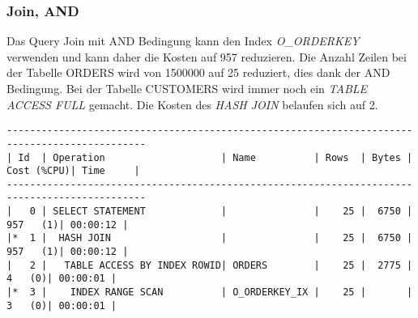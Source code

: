 \documentclass[11pt,a4paper,parskip=half]{scrartcl}
\begin{document}
\subsubsection{Join, AND}
Das Query Join mit AND Bedingung kann den Index \emph{O\_ORDERKEY} verwenden und kann daher die Kosten auf 957 reduzieren. Die Anzahl Zeilen bei der Tabelle ORDERS wird von 1500000 auf 25 reduziert, dies dank der AND Bedingung. Bei der Tabelle CUSTOMERS wird immer noch ein \emph{TABLE ACCESS FULL} gemacht. Die Kosten des \emph{HASH JOIN} belaufen sich auf 2.
\begin{lstlisting}
----------------------------------------------------------------------------------------------                                                                                                                                                                                                               
| Id  | Operation                    | Name          | Rows  | Bytes | Cost (%CPU)| Time     |                                                                                                                                                                                                               
----------------------------------------------------------------------------------------------                                                                                                                                                                                                               
|   0 | SELECT STATEMENT             |               |    25 |  6750 |   957   (1)| 00:00:12 |                                                                                                                                                                                                               
|*  1 |  HASH JOIN                   |               |    25 |  6750 |   957   (1)| 00:00:12 |                                                                                                                                                                                                               
|   2 |   TABLE ACCESS BY INDEX ROWID| ORDERS        |    25 |  2775 |     4   (0)| 00:00:01 |                                                                                                                                                                                                               
|*  3 |    INDEX RANGE SCAN          | O_ORDERKEY_IX |    25 |       |     3   (0)| 00:00:01 |                                                                                                                                                                                                               

\end{lstlisting}
\end{document}
